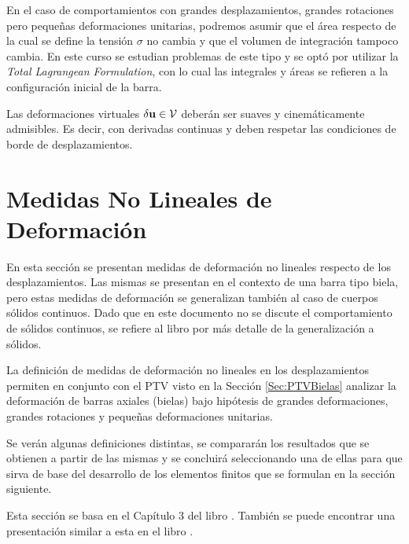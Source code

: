 En el caso de comportamientos con grandes desplazamientos, grandes rotaciones pero pequeñas deformaciones unitarias, podremos asumir que el área respecto de la cual se define la tensión $\sigma$ no cambia y que el volumen de integración tampoco cambia. En este curso se estudian problemas de este tipo y se optó por utilizar la \textit{Total Lagrangean Formulation}, con lo cual las integrales y áreas se refieren a la configuración inicial de la barra.


Las deformaciones virtuales $\delta {\bf u} \in {\mathcal V}$ deberán ser suaves y cinemáticamente admisibles. Es decir, con derivadas continuas y deben respetar las condiciones de borde de desplazamientos.



\section{Medidas No Lineales de Deformación} \label{sec:nlsm}

En esta sección se presentan medidas de deformación no lineales respecto de los desplazamientos. Las mismas se presentan en el contexto de una barra tipo biela, pero estas medidas de deformación se generalizan también al caso de cuerpos sólidos continuos. %
%
Dado que en este documento no se discute el comportamiento de sólidos continuos, se refiere al libro \citep{crisfield1996non} por más detalle de la generalización a sólidos.

La definición de medidas de deformación no lineales en los desplazamientos permiten en conjunto con el PTV visto en la Sección \ref{Sec:PTVBielas} analizar la deformación de barras axiales (bielas) bajo hipótesis de grandes deformaciones, grandes rotaciones y pequeñas deformaciones unitarias.

Se verán algunas definiciones distintas, se compararán los resultados que se obtienen a partir de las mismas y se concluirá seleccionando una de ellas para que sirva de base del desarrollo de los elementos finitos que se formulan en la sección siguiente.

Esta sección se basa en el Capítulo 3 del libro \citep{crisfield1996non}. También se puede encontrar una presentación similar a esta en el libro \citep{bonet2008nonlinear}.


